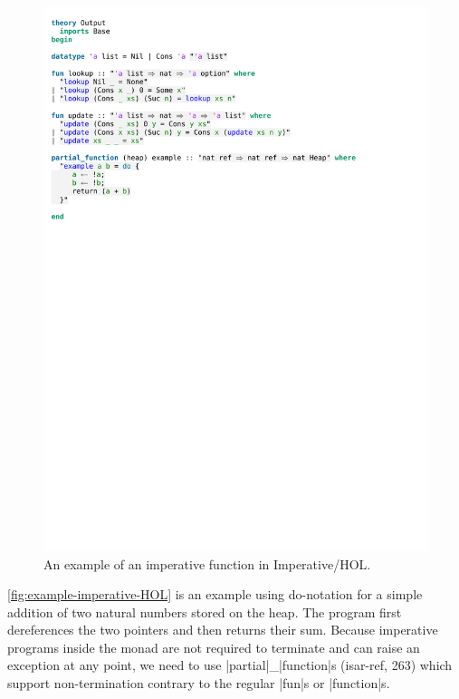 \begin{figure}[htpb]
    \includegraphics[trim={0 18,9cm 0 8cm}, clip, width=1.00\textwidth]{figures/Theory_Intro.pdf}
    \caption[Imperative/HOL Example]{An example of an imperative function in Imperative/HOL.}
    \label{fig:example-imperative-HOL}
\end{figure}

\noindent \autoref{fig:example-imperative-HOL} is an example using do-notation for a simple addition of two natural numbers stored on the heap. The program first dereferences the two pointers and then returns their sum. 
Because imperative programs inside the monad are not required to terminate and can raise an exception at any point, we need to use |partial|\_|function|s (isar-ref, 263) which support non-termination contrary to the regular |fun|s or |function|s.

